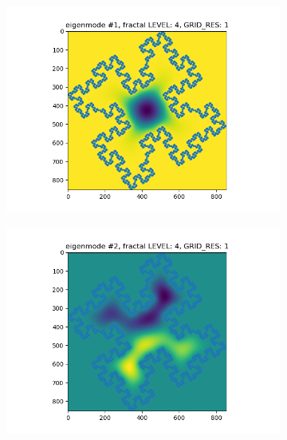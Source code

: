\documentclass{article}
\begin{document}
\newpage
\begin{figure}
    \begin{subfigure}{0.3\textwidth}
        \includegraphics[width=\linewidth]{./media/eigenmode_2d1.png}
    \end{subfigure}
    \begin{subfigure}{0.3\textwidth}
        \includegraphics[width=\linewidth]{./media/eigenmode_2d2.png}
    \end{subfigure}
    \begin{subfigure}{0.3\textwidth}

\end{subfigure}
\end{figure}
\end{document}

